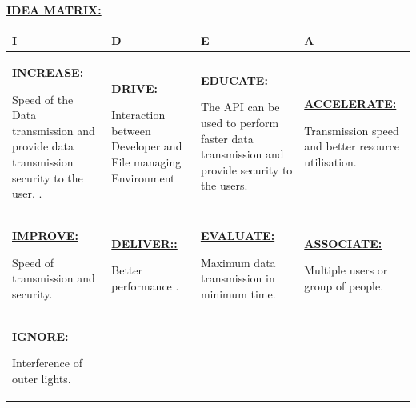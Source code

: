 \documentclass[12pt,a4paper]
{article}
\numberwithin{table}{section}
\begin{document}
{{{{{{{{{\begin{appendices}
{ \large{ \underline{ \textbf{IDEA MATRIX: }}}

\begin{center}
 \begin{tabular}{|p{100pt}|p{100pt} | p{100pt} | p{100pt} |} 

 \hline

 \textbf{ I} & \textbf{D} & \textbf{E} & \textbf{A} \\ 
 \hline
 \underline {\textbf{INCREASE: }} \par Speed of the Data transmission and  provide data transmission security to the user.
 . \par &
 
  \underline {\textbf{DRIVE: }} \par Interaction between Developer and File managing Environment \par  &
  
  \underline {\textbf{EDUCATE:}} \par The API can be used to perform faster data transmission and provide security to the users.
\par & 
  
\underline {\textbf{ACCELERATE:}} \par Transmission speed and better resource utilisation. \par  
  \\
 \hline

 

 \underline {\textbf{IMPROVE: }} \par 
Speed of transmission and security. \par &
 
  \underline {\textbf{DELIVER:: }} \par Better performance . \par  &
  
  \underline {\textbf{EVALUATE:}} \par Maximum data transmission in minimum time. \par & 
  
\underline {\textbf{ASSOCIATE:}} \par Multiple users or group of people.

\par  
  \\
 \hline



 
 
\underline{  \textbf{IGNORE:} } \par Interference of outer lights. \par &
 

\end{tabular}
\end{center}}
\end{appendices}}}}}}}}}}
\end{document}
